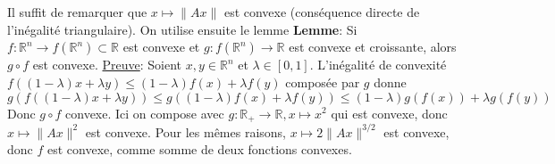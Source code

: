 \documentclass{report}
\begin{document}
\subsection{} \noindent{}\\ 
\\ 
\\
\noindent Il suffit de remarquer que $x\mapsto \|Ax\|$ est convexe (conséquence directe de l'inégalité triangulaire). On utilise ensuite le lemme\newline
\textbf{Lemme}: Si $f:\mathbb R^n\to f(\mathbb R^n)\subset \mathbb R$ est convexe et $g:f(\mathbb R^n)\to \mathbb R$ est convexe et croissante, alors $g\circ f$ est convexe.\newline 
\underline{Preuve}: Soient $x,y\in \mathbb R^n$ et $\lambda \in [0,1]$. L'inégalité de convexité $f((1-\lambda)x+\lambda y)\leq (1-\lambda)f(x) + \lambda f(y)$ composée par $g$ donne $$g(f((1-\lambda)x+\lambda y)) \leq g((1-\lambda)f(x) + \lambda f(y))\leq (1-\lambda)g(f(x)) + \lambda g(f(y))$$
Donc $g\circ f$ convexe. \newline \newline
Ici on compose avec $g:\mathbb R_+\to \mathbb R, x\mapsto x^2 $ qui est convexe, donc $x\mapsto \|Ax\|^2$ est convexe.\newline
Pour les mêmes raisons, $x\mapsto 2\|Ax\|^{3/2}$ est convexe, donc $f$ est convexe, comme somme de deux fonctions convexes.

\subsection{} \noindent{}\\ 
\\ 
\\
\noindent
\end{document}
